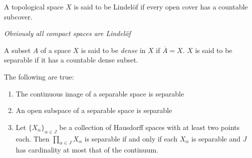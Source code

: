 \begin{definition}
    A topological space $X$ is said to be Lindel\"of if every open cover has a countable subcover.

    \noindent\textit{Obviously all compact spaces are Lindel\"of}
\end{definition}

\begin{definition}[Dense]
    A subset $A$ of a space $X$ is said to be \textit{dense} in $X$ if $\overline{A} = X$. $X$ is said to be separable if it has a countable dense subset.
\end{definition}

\begin{theorem}
    The following are true: 
    \begin{enumerate}[label=(\alph*)]
    \item The continuous image of a separable space is separable 
    \item An open subspace of a separable space is separable
    \item Let $\{X_\alpha\}_{\alpha\in J}$ be a collection of Hausdorff spaces with at least two points each. Then $\prod_{\alpha\in J}X_\alpha$ is separable if and only if each $X_\alpha$ is separable and $J$ has cardinality at most that of the continuum.
    \end{enumerate}
\end{theorem}
